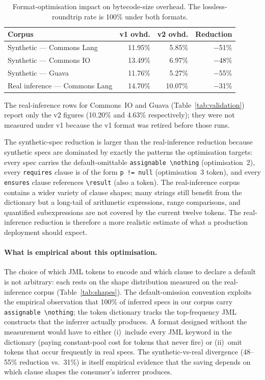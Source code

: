 \begin{table}[ht]
\centering
\caption{Format-optimisation impact on bytecode-size overhead. The lossless-roundtrip rate is 100\% under both formats.}
\label{tab:opt}
\setlength{\tabcolsep}{3pt}
\begin{tabular}{lrrr}
\toprule
\textbf{Corpus} & \textbf{v1 ovhd.} & \textbf{v2 ovhd.} & \textbf{Reduction} \\
\midrule
Synthetic --- Commons Lang      & 11.95\% & 5.85\%  & $-$51\% \\
Synthetic --- Commons IO        & 13.49\% & 6.97\%  & $-$48\% \\
Synthetic --- Guava             & 11.76\% & 5.27\%  & $-$55\% \\
\midrule
Real inference --- Commons Lang & 14.70\% & 10.07\% & $-$31\% \\
\bottomrule
\end{tabular}
\smallskip

The real-inference rows for Commons~IO and Guava (Table~\ref{tab:validation}) report only the v2 figures (10.20\% and 4.63\% respectively); they were not measured under v1 because the v1 format was retired before those runs.
\end{table}

The synthetic-spec reduction is larger than the real-inference reduction because synthetic specs are dominated by exactly the patterns the optimisation targets: every spec carries the default-omittable \texttt{assignable \textbackslash nothing} (optimisation~2), every \texttt{requires} clause is of the form \texttt{p != null} (optimisation~3 token), and every \texttt{ensures} clause references \texttt{\textbackslash result} (also a token). The real-inference corpus contains a wider variety of clause shapes; many strings still benefit from the dictionary but a long-tail of arithmetic expressions, range comparisons, and quantified subexpressions are not covered by the current twelve tokens. The real-inference reduction is therefore a more realistic estimate of what a production deployment should expect.

\paragraph{What is empirical about this optimisation.}
The choice of which JML tokens to encode and which clause to declare a default is not arbitrary: each rests on the shape distribution measured on the real-inference corpus (Table~\ref{tab:shapes}). The default-omission convention exploits the empirical observation that 100\% of inferred specs in our corpus carry \texttt{assignable \textbackslash nothing}; the token dictionary tracks the top-frequency JML constructs that the inferrer actually produces. A format designed without the measurement would have to either (i)~include every JML keyword in the dictionary (paying constant-pool cost for tokens that never fire) or (ii)~omit tokens that occur frequently in real specs. The synthetic-vs-real divergence (48--55\% reduction vs.\ 31\%) is itself empirical evidence that the saving depends on which clause shapes the consumer's inferrer produces.

